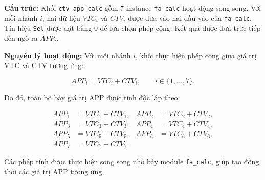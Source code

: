 \documentclass[12pt,a4paper,oneside]{book}
\begin{document}
\textbf{Cấu trúc:} Khối \texttt{ctv\_app\_calc} gồm 7 instance \texttt{fa\_calc} hoạt động song song. Với mỗi nhánh $i$, hai dữ liệu $VTC_i$ và $CTV_i$ được đưa vào hai đầu vào của \texttt{fa\_calc}. Tín hiệu \texttt{Sel} được đặt bằng $0$ để lựa chọn phép cộng. Kết quả được đưa trực tiếp đến ngõ ra $APP_i$.

\textbf{Nguyên lý hoạt động:} Với mỗi nhánh $i$, khối thực hiện phép cộng giữa giá trị VTC và CTV tương ứng:

\begin{equation}
    APP_i = VTC_i + CTV_i,
    \qquad i\in\{1,\ldots,7\}.
\end{equation}

Do đó, toàn bộ bảy giá trị APP được tính độc lập theo:

\begin{align}
    APP_1 &= VTC_1 + CTV_1, &
    APP_2 &= VTC_2 + CTV_2, \nonumber\\
    APP_3 &= VTC_3 + CTV_3, &
    APP_4 &= VTC_4 + CTV_4, \nonumber\\
    APP_5 &= VTC_5 + CTV_5, &
    APP_6 &= VTC_6 + CTV_6, \nonumber\\
    APP_7 &= VTC_7 + CTV_7. &&
\end{align}

Các phép tính được thực hiện song song nhờ bảy module \texttt{fa\_calc}, giúp tạo đồng thời các giá trị APP tương ứng.



\end{document}
